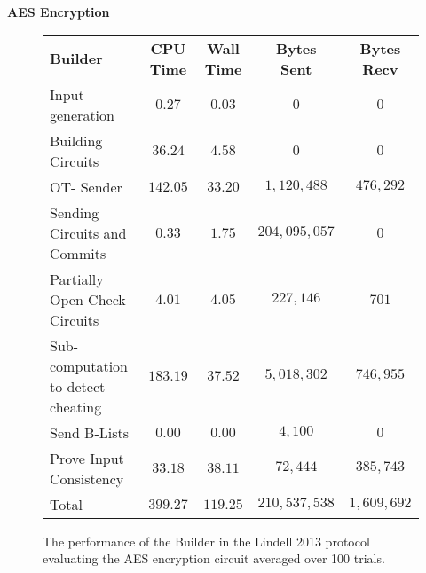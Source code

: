 \documentclass[ %
                    author={Nicholas Tutte},
                supervisor={Prof. Nigel Smart},
                    degree={MEng},
                     title={Secure Two Party Computation},
                  subtitle={A practical comparison of recent protocols},
                      type={Research - GG1K},
                      year={2015} ]{dissertation}
\begin{document}
				\FloatBarrier
				\noindent \textbf{AES Encryption}
				\begin{figure}[!ht]
					\begin{tabular}{| p{4.3cm} | c c c c |}
						\hline
						\textbf{Builder} & \textbf{CPU Time} & \textbf{Wall Time} & \textbf{Bytes Sent} & \textbf{Bytes Recv} \\
						\thickhline
						Input generation & $0.27$ & $0.03$ & $0$ & $0$ \\
						\hline
						Building Circuits & $36.24$ & $4.58$ & $0$ & $0$ \\
						\hline
						OT- Sender & $142.05$ & $33.20$ & $1,120,488$ & $476,292$ \\
						\hline
						Sending Circuits and Commits & $0.33$ & $1.75$ & $204,095,057$ & $0$ \\
						\hline
						Partially Open Check Circuits & $4.01$ & $4.05$ & $227,146$ & $701$ \\
						\hline
						Sub-computation to detect cheating & $183.19$ & $37.52$ & $5,018,302$ & $746,955$ \\
						\hline
						Send B-Lists & $0.00$ & $0.00$ & $4,100$ & $0$ \\
						\hline
						Prove Input Consistency & $33.18$ & $38.11$ & $72,444$ & $385,743$ \\
						\thickhline
						Total & $399.27$ & $119.25$ & $210,537,538$ & $1,609,692$ \\
						\hline
					\end{tabular}
					\caption{The performance of the Builder in the Lindell 2013 protocol evaluating the AES encryption circuit averaged over 100 trials. \label{table:L_2013_AES_Builder}}
				\end{figure}
\end{document}
